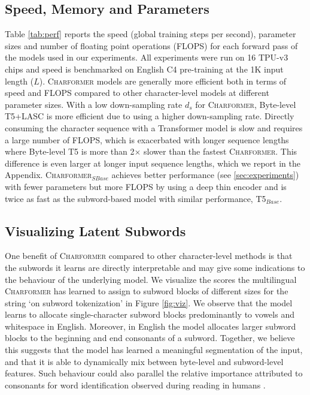 \documentclass{article} \usepackage{iclr2022_conference,times}
\newcommand{\charformer}{\textsc{Charformer}\xspace}
\newcommand{\charformertall}{\textsc{Charformer}$_{SBase}$\xspace}
\newcommand{\byte}{Byte-level T5\xspace}
\newcommand{\canine}{Byte-level T5+LASC\xspace}
\begin{document}
\subsection{Speed, Memory and Parameters} \label{sec:speed}
Table \ref{tab:perf} reports the speed (global training steps per second), parameter sizes and number of floating point operations (FLOPS) for each forward pass of the models used in our experiments. All experiments were run on 16 TPU-v3 chips and speed is benchmarked on English C4 pre-training at the 1K input length ($L$). \charformer models are generally more efficient both in terms of speed and FLOPS compared to other character-level models at different parameter sizes. With a low down-sampling rate $d_s$ for \charformer, \canine is more efficient due to using a higher down-sampling rate. Directly consuming the character sequence with a Transformer model is slow and requires a large number of FLOPS, which is exacerbated with longer sequence lengths where \byte is more than 2$\times$ slower than the fastest \charformer. This difference is even larger at longer input sequence lengths, which we report in the Appendix. \charformertall achieves better performance (see \textsection \ref{sec:experiments}) with fewer parameters but more FLOPS by using a deep thin encoder and is twice as fast as the subword-based model with similar performance, T5$_{Base}$.

\subsection{Visualizing Latent Subwords}

One benefit of \charformer compared to other character-level methods is that the subwords it learns are directly interpretable and may give some indications to the behaviour of the underlying model. We visualize the scores the multilingual \charformer has learned to assign to subword blocks of different sizes for the string `on subword tokenization' in Figure \ref{fig:viz}. We observe that the model learns to allocate single-character subword blocks predominantly to vowels and whitespace in English. Moreover, in English the model allocates larger subword blocks to the beginning and end consonants of a subword. Together, we believe this suggests that the model has learned a meaningful segmentation of the input, and that it is able to dynamically mix between byte-level and subword-level features. Such behaviour could also parallel the relative importance attributed to consonants for word identification observed during reading in humans \citep{lee2001relative,carreiras2008vowels}.
\end{document}
